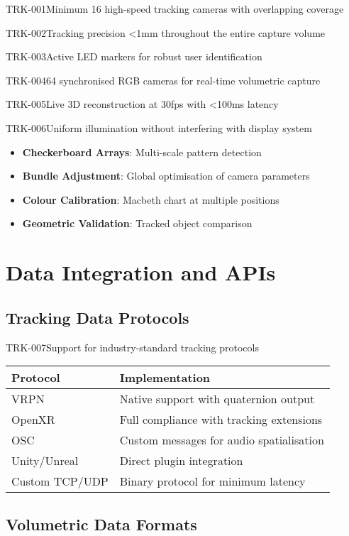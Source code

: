 \begin{requirement}{TRK-001}{Minimum 16 high-speed tracking cameras with overlapping coverage}
\begin{requirement}{TRK-002}{Tracking precision <1mm throughout the entire capture volume}
\begin{requirement}{TRK-003}{Active LED markers for robust user identification}
\begin{requirement}{TRK-004}{64 synchronised RGB cameras for real-time volumetric capture}
\begin{requirement}{TRK-005}{Live 3D reconstruction at 30fps with <100ms latency}
\begin{requirement}{TRK-006}{Uniform illumination without interfering with display system}
\begin{itemize}
    \item \textbf{Checkerboard Arrays}: Multi-scale pattern detection
    \item \textbf{Bundle Adjustment}: Global optimisation of camera parameters
    \item \textbf{Colour Calibration}: Macbeth chart at multiple positions
    \item \textbf{Geometric Validation}: Tracked object comparison
\end{itemize}

\section{Data Integration and APIs}

\subsection{Tracking Data Protocols}

\begin{requirement}{TRK-007}{Support for industry-standard tracking protocols}

\begin{table}[H]
\centering
\begin{tabularx}{\textwidth}{@{}lX@{}}
\toprule
\textbf{Protocol} & \textbf{Implementation} \\
\midrule
VRPN & Native support with quaternion output \\
OpenXR & Full compliance with tracking extensions \\
OSC & Custom messages for audio spatialisation \\
Unity/Unreal & Direct plugin integration \\
Custom TCP/UDP & Binary protocol for minimum latency \\
\bottomrule
\end{tabularx}
\end{table}

\subsection{Volumetric Data Formats}


\end{requirement}
\end{requirement}
\end{requirement}
\end{requirement}
\end{requirement}
\end{requirement}
\end{requirement}
